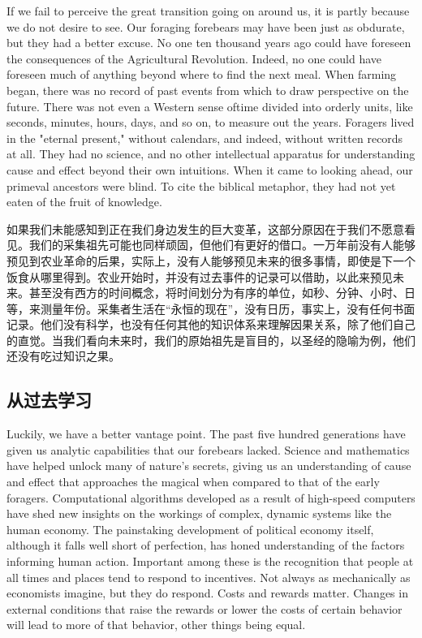 \begin{Parallel}{97mm}{72mm}
  \ParallelLText
  {If we fail to perceive the great transition going on around us, it is partly because we do not desire to see. Our foraging forebears may have been just as obdurate, but they had a better excuse. No one ten thousand years ago could have foreseen the consequences of the Agricultural Revolution. Indeed, no one could have foreseen much of anything beyond where to find the next meal. When farming began, there was no record of past events from which to draw perspective on the future. There was not even a Western sense oftime divided into orderly units, like seconds, minutes, hours, days, and so on, to measure out the years. Foragers lived in the "eternal present," without calendars, and indeed, without written records at all. They had no science, and no other intellectual apparatus for understanding cause and effect beyond their own intuitions. When it came to looking ahead, our primeval ancestors were blind. To cite the biblical metaphor, they had not yet eaten of the fruit of knowledge.}
  
  \ParallelRText
  {如果我们未能感知到正在我们身边发生的巨大变革，这部分原因在于我们不愿意看见。我们的采集祖先可能也同样顽固，但他们有更好的借口。一万年前没有人能够预见到农业革命的后果，实际上，没有人能够预见未来的很多事情，即使是下一个饭食从哪里得到。农业开始时，并没有过去事件的记录可以借助，以此来预见未来。甚至没有西方的时间概念，将时间划分为有序的单位，如秒、分钟、小时、日等，来测量年份。采集者生活在“永恒的现在”，没有日历，事实上，没有任何书面记录。他们没有科学，也没有任何其他的知识体系来理解因果关系，除了他们自己的直觉。当我们看向未来时，我们的原始祖先是盲目的，以圣经的隐喻为例，他们还没有吃过知识之果。}
  \ParallelPar

  \subsection{从过去学习}

  \ParallelLText
  {Luckily, we have a better vantage point. The past five hundred generations have given us analytic capabilities that our forebears lacked. Science and mathematics have helped unlock many of nature's secrets, giving us an understanding of cause and effect that approaches the magical when compared to that of the early foragers. Computational algorithms developed as a result of high-speed computers have shed new insights on the workings of complex, dynamic systems like the human economy. The painstaking development of political economy itself, although it falls well short of perfection, has honed understanding of the factors informing human action. Important among these is the recognition that people at all times and places tend to respond to incentives. Not always as mechanically as economists imagine, but they do respond. Costs and rewards matter. Changes in external conditions that raise the rewards or lower the costs of certain behavior will lead to more of that behavior, other things being equal.}
  

\end{Parallel}
